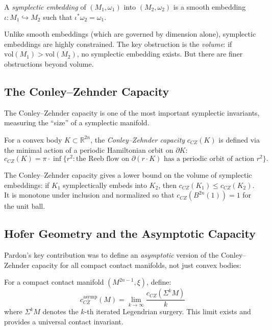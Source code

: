 \begin{definition}
A \emph{symplectic embedding} of $(M_1, \omega_1)$ into $(M_2, \omega_2)$ is a smooth embedding $\iota: M_1 \hookrightarrow M_2$ such that $\iota^* \omega_2 = \omega_1$.
\end{definition}

Unlike smooth embeddings (which are governed by dimension alone), symplectic embeddings are highly constrained. The key obstruction is the \emph{volume}: if $\text{vol}(M_1) > \text{vol}(M_2)$, no symplectic embedding exists. But there are finer obstructions beyond volume.

\subsection{The Conley--Zehnder Capacity}

The Conley--Zehnder capacity is one of the most important symplectic invariants, measuring the ``size'' of a symplectic manifold.

\begin{definition}
For a convex body $K \subset \mathbb{R}^{2n}$, the \emph{Conley--Zehnder capacity} $c_{CZ}(K)$ is defined via the minimal action of a periodic Hamiltonian orbit on $\partial K$:
\[
c_{CZ}(K) = \pi \cdot \inf \{ r^2 : \text{the Reeb flow on } \partial(r \cdot K) \text{ has a periodic orbit of action } r^2 \}.
\]
\end{definition}

The Conley--Zehnder capacity gives a lower bound on the volume of symplectic embeddings: if $K_1$ symplectically embeds into $K_2$, then $c_{CZ}(K_1) \le c_{CZ}(K_2)$. It is monotone under inclusion and normalized so that $c_{CZ}(B^{2n}(1)) = 1$ for the unit ball.

\subsection{Hofer Geometry and the Asymptotic Capacity}

Pardon's key contribution was to define an \emph{asymptotic} version of the Conley--Zehnder capacity for all compact contact manifolds, not just convex bodies:

\begin{theorem}
For a compact contact manifold $(M^{2n-1}, \xi)$, define:
\[
c_{CZ}^{\text{asymp}}(M) = \lim_{k \to \infty} \frac{c_{CZ}(\Sigma^k M)}{k}
\]
where $\Sigma^k M$ denotes the $k$-th iterated Legendrian surgery. This limit exists and provides a universal contact invariant.
\end{theorem}

